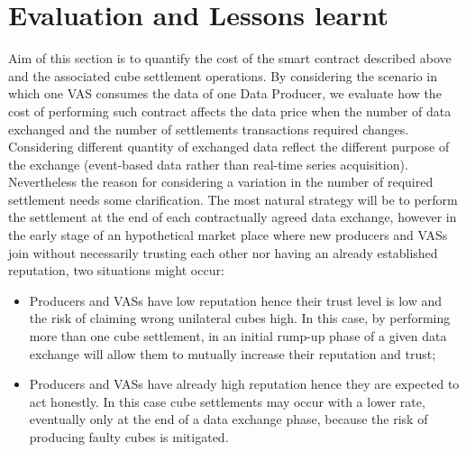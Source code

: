 \begin{table}[]
	\centering
	\caption{Execution cost of cube settlment contract operations.}
	\label{tab:execution_costl}
	\tiny 
\end{table}
\vspace{-10pt}

\section{Evaluation and Lessons learnt}
\label{sec:evaluation}
Aim of this section is to quantify the cost of the smart contract described above and the associated cube settlement operations. By considering the scenario in which one VAS consumes the data of one Data Producer, we evaluate how the cost of performing such contract affects the data price when the number of data exchanged and the number of settlements transactions required changes. Considering different quantity of exchanged data reflect the different purpose of the exchange (event-based data rather than real-time series acquisition). Nevertheless the reason for considering a variation in the number of required settlement needs some clarification. The most natural strategy will be to perform the settlement at the end of each contractually agreed data exchange, however in the early stage of an hypothetical market place where new producers and VASs join without necessarily trusting each other nor having an already established reputation, two situations might occur:
\begin{itemize}
	\item Producers and VASs have low reputation hence their trust level is low and the risk of claiming wrong unilateral cubes high. In this case, by performing more than one cube settlement, in an initial rump-up phase of a given data exchange will allow them to mutually increase their reputation and trust;
	\vspace{-10pt}
	\item Producers and VASs have already high reputation hence they are expected to act honestly. In this case cube settlements may occur with a lower rate, eventually only at the end of a data exchange phase, because the risk of producing faulty cubes is mitigated.
\end{itemize}

